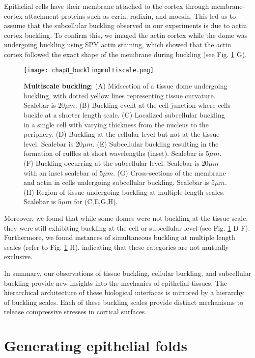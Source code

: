 Epithelial cells have their membrane attached to the cortex through membrane-cortex attachment proteins such as ezrin, radixin, and moesin. This led us to assume that the subcellular buckling observed in our experiments is due to actin cortex buckling. To confirm this, we imaged the actin cortex while the dome was undergoing buckling using SPY actin staining, which showed that the actin cortex followed the exact shape of the membrane during buckling (see Fig. \ref{fig_8_4} G).

\begin{figure}[h!]
	\centering
	\texttt{[image: chap8\_bucklingmultiscale.png]}
	\caption{\label{fig_8_4} \textbf{Multiscale buckling}: (A) Midsection of a tissue dome undergoing buckling, with dotted yellow lines representing tissue curvature. Scalebar is $20\mu m$. (B) Buckling event at the cell junction where cells buckle at a shorter length scale. (C) Localized subcellular buckling in a single cell with varying thickness from the nucleus to the periphery. (D) Buckling at the cellular level but not at the tissue level. Scalebar is $20\mu m$. (E) Subcellular buckling resulting in the formation of ruffles at short wavelengths (inset). Scalebar is $5 \mu m$. (F) Buckling occurring at the subcellular level. Scalebar is $20\mu m$ with an inset scalebar of $5 \mu m$. (G) Cross-sections of the membrane and actin in cells undergoing subcellular buckling. Scalebar is $5\mu m$. (H) Region of tissue undergoing buckling at multiple length scales. Scalebar is $5\mu m$ for (C,E,G,H).}
\end{figure}

Moreover, we found that while some domes were not buckling at the tissue scale, they were still exhibiting buckling at the cell or subcellular level (see Fig.  \ref{fig_8_4} D F). Furthermore, we found instances of simultaneous buckling at multiple length scales (refer to Fig. \ref{fig_8_4} H), indicating that these categories are not mutually exclusive.

In summary, our observations of tissue buckling, cellular buckling, and subcellular buckling provide new insights into the mechanics of epithelial tissues. The hierarchical architecture of these biological interfaces is mirrored by a hierarchy of buckling scales. Each of these buckling scales provide distinct mechanisms to release compressive stresses in cortical surfaces. 

\hypertarget{generating-epithelial-folds}{%
	\section{Generating epithelial
		folds}\label{generating-epithelial-folds}}

